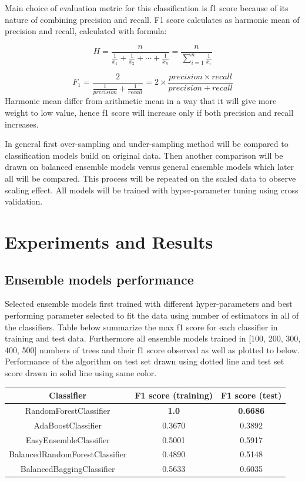 \documentclass[12pt]{article}
\begin{document}
Main choice of evaluation metric for this classification is f1 score because of its nature of combining precision and recall. F1 score calculates as harmonic mean of precision and recall, calculated with formula:

\begin{equation*}
    H = \frac{n}{\frac{1}{x_{1}} + \frac{1}{x_{2}} + \cdots + \frac{1}{x_{n}}} = \frac{n}{\sum_{i=1}^n{\frac{1}{x_{i}}}}
\end{equation*}

\begin{equation*}
    F_{1} = \frac{2}{\frac{1}{precision} + \frac{1}{recall}} = 2 \times \frac{precision \times recall}{precision + recall}
\end{equation*}
Harmonic mean differ from arithmetic mean in a way that it will give more weight to low value, hence f1 score will increase only if both precision and recall increases.

In general first over-sampling and under-sampling method will be compared to classification models build on original data. Then another comparison will be drawn on balanced ensemble models versus general ensemble models which later all will be compared. This process will be repeated on the scaled data to observe scaling effect. All models will be trained with hyper-parameter tuning using cross validation.

\section{Experiments and Results} \label{sec:experiment}
\subsection{Ensemble models performance} \label{subse:ensemblemodelperformance}
Selected ensemble models first trained with different hyper-parameters and best performing parameter selected to fit the data using number of estimators in all of the classifiers. Table below summarize the max f1 score for each classifier in training and test data. Furthermore all ensemble models trained in [100, 200, 300, 400, 500] numbers of trees and their f1 score observed as well as plotted to below. Performance of the algorithm on test set drawn using dotted line and test set score drawn in solid line using same color.

\begin{center}
    \begin{tabular}{||c c c||} 
    \hline
    Classifier & F1 score (training) & F1 score (test)\\ [0.5ex] 
    \hline\hline
    RandomForestClassifier & \textbf{1.0} & \textbf{0.6686} \\ 
    \hline
    AdaBoostClassifier & 0.3670 & 0.3892 \\
    \hline
    EasyEnsembleClassifier & 0.5001 & 0.5917 \\
    \hline
    BalancedRandomForestClassifier & 0.4890 & 0.5148 \\
    \hline
    BalancedBaggingClassifier & 0.5633 & 0.6035\\ [1ex] 
    \hline
   \end{tabular}
\end{center}
\end{document}
